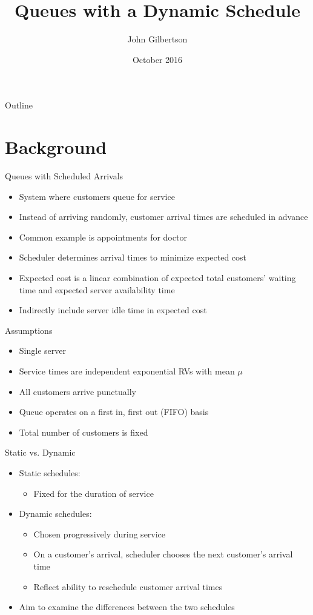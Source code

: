 \documentclass{beamer}
\title{Queues with a Dynamic Schedule}
\author{John Gilbertson}
\date{October 2016}
\begin{document}
\begin{frame}
	\titlepage
\end{frame}

\begin{frame}{Outline}
	\tableofcontents
\end{frame}

\section{Background}

\begin{frame}{Queues with Scheduled Arrivals}
	\begin{itemize}
		\item System where customers queue for service
		\item Instead of arriving randomly, customer arrival times are scheduled in advance
		\item Common example is appointments for doctor
		\item Scheduler determines arrival times to minimize expected cost
		\item Expected cost is a linear combination of expected total customers' waiting time and expected server availability time
		\item Indirectly include server idle time in expected cost
	\end{itemize}
\end{frame}

\begin{frame}{Assumptions}
	\begin{itemize}
		\item Single server
		\item Service times are independent exponential RVs with mean $\mu$
		\item All customers arrive punctually
		\item Queue operates on a first in, first out (FIFO) basis
		\item Total number of customers is fixed
	\end{itemize}
\end{frame}

\begin{frame}{Static vs. Dynamic}
	\begin{itemize}
		\item Static schedules:
		\begin{itemize}
			\item Fixed for the duration of service
		\end{itemize}
		\item Dynamic schedules:
		\begin{itemize}
		 	\item Chosen progressively during service
		 	\item On a customer's arrival, scheduler chooses the next customer's arrival time
		 	\item Reflect ability to reschedule customer arrival times
		 \end{itemize}
		\item Aim to examine the differences between the two schedules
	\end{itemize}
\end{frame}
\end{document}
